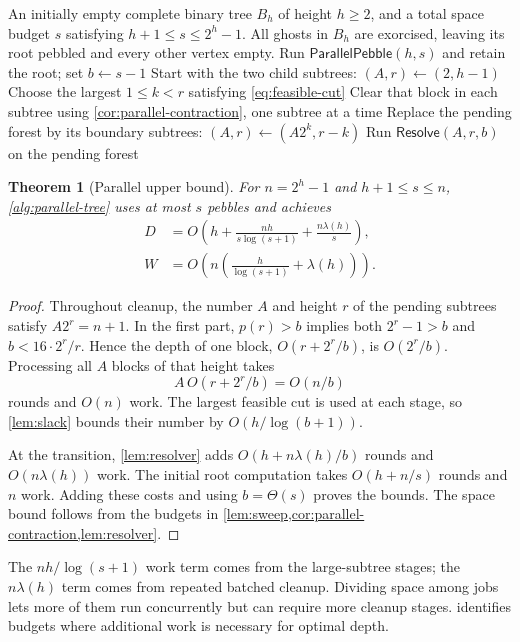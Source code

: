 \documentclass[11pt]{article}
\newtheorem{theorem}{Theorem}[section]
\theoremstyle{definition}
\theoremstyle{remark}
\newcommand{\Sweep}{\mathsf{ParallelPebble}}
\newcommand{\Resolve}{\mathsf{Resolve}}
\begin{document}
\begin{algorithm}[H]
\caption{Parallel block cleanup on complete trees}
\label{alg:parallel-tree}
\begin{algorithmic}[1]
\Require An initially empty complete binary tree $B_h$ of height $h\ge2$, and a total space budget $s$ satisfying $h+1\le s\le2^h-1$.
\Ensure All ghosts in $B_h$ are exorcised, leaving its root pebbled and every other vertex empty.
\State Run $\Sweep(h,s)$ and retain the root; set $b\gets s-1$
\State Start with the two child subtrees: $(A,r)\gets(2,h-1)$
 \State Choose the largest $1\le k<r$ satisfying \cref{eq:feasible-cut}
 \State Clear that block in each subtree using \cref{cor:parallel-contraction}, one subtree at a time
 \State Replace the pending forest by its boundary subtrees: $(A,r)\gets(A2^k,r-k)$
\EndWhile
\State Run $\Resolve(A,r,b)$ on the pending forest
\end{algorithmic}
\end{algorithm}

\begin{theorem}[Parallel upper bound]
\label{thm:parallel-upper}
For $n=2^h-1$ and $h+1\le s\le n$, \cref{alg:parallel-tree} uses at most $s$ pebbles and achieves
\begin{align}
D&=O\!\left(h+\frac{nh}{s\log(s+1)}+\frac{n\lambda(h)}s\right), \label{eq:depth-upper}\\
W&=O\!\left(n\left(\frac h{\log(s+1)}+\lambda(h)\right)\right). \label{eq:depth-schedule-work}
\end{align}
\end{theorem}
\begin{proof}
Throughout cleanup, the number $A$ and height $r$ of the pending subtrees satisfy $A2^r=n+1$. In the first part, $p(r)>b$ implies both $2^r-1>b$ and $b<16\cdot2^r/r$. Hence the depth of one block, $O(r+2^r/b)$, is $O(2^r/b)$. Processing all $A$ blocks of that height takes
\[
A\,O(r+2^r/b)=O(n/b)
\]
rounds and $O(n)$ work. The largest feasible cut is used at each stage, so \cref{lem:slack} bounds their number by $O(h/\log(b+1))$.

At the transition, \cref{lem:resolver} adds $O(h+n\lambda(h)/b)$ rounds and $O(n\lambda(h))$ work. The initial root computation takes $O(h+n/s)$ rounds and $n$ work. Adding these costs and using $b=\Theta(s)$ proves the bounds. The space bound follows from the budgets in \cref{lem:sweep,cor:parallel-contraction,lem:resolver}.
\end{proof}

The $nh/\log(s+1)$ work term comes from the large-subtree stages; the $n\lambda(h)$ term comes from repeated batched cleanup. Dividing space among jobs lets more of them run concurrently but can require more cleanup stages.  identifies budgets where additional work is necessary for optimal depth.
\end{document}
